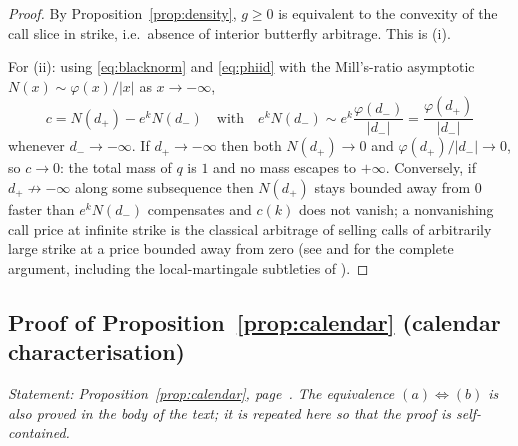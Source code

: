 \begin{proof}
By Proposition~\ref{prop:density}, $g\ge0$ is equivalent to the convexity of the call slice in
strike, i.e.\ absence of interior butterfly arbitrage. This is (i).

For (ii): using \eqref{eq:blacknorm} and \eqref{eq:phiid} with the Mill's-ratio asymptotic
$N(x)\sim\varphi(x)/|x|$ as $x\to-\infty$,
\[
c=N(d_+)-e^kN(d_-)\quad\text{with}\quad
e^kN(d_-)\sim e^k\frac{\varphi(d_-)}{|d_-|}=\frac{\varphi(d_+)}{|d_-|}
\]
whenever $d_-\to-\infty$. If $d_+\to-\infty$ then both $N(d_+)\to0$ and
$\varphi(d_+)/|d_-|\to0$, so $c\to0$: the total mass of $q$ is $1$ and no mass escapes to
$+\infty$. Conversely, if $d_+\not\to-\infty$ along some subsequence then $N(d_+)$ stays
bounded away from $0$ faster than $e^kN(d_-)$ compensates and $c(k)$ does not vanish; a
nonvanishing call price at infinite strike is the classical arbitrage of selling calls of
arbitrarily large strike at a price bounded away from zero (see \cite{roper2010} and
\cite[\S2]{gatheraljacquier2014} for the complete argument, including the local-martingale
subtleties of \cite{coxhobson2005}).
\end{proof}

\subsection{Proof of Proposition~\ref{prop:calendar} (calendar characterisation)}
\label{proof:calendar}

\noindent\emph{Statement: Proposition~\ref{prop:calendar}, page~\pageref{prop:calendar}. The
equivalence $(a)\iff(b)$ is also proved in the body of the text; it is repeated here so that the
proof is self-contained.}\medskip

